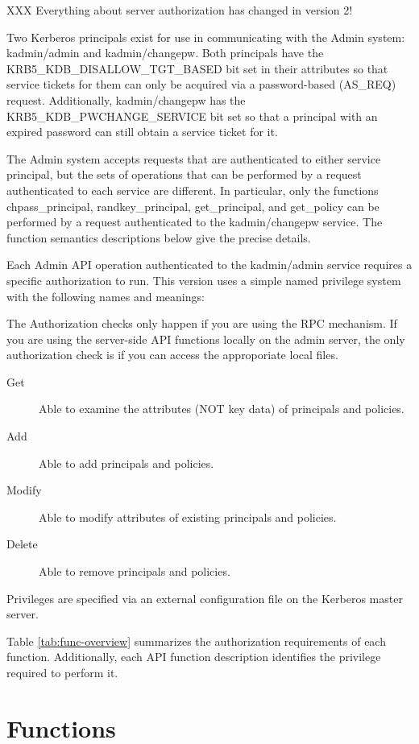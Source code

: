 XXX Everything about server authorization has changed in version 2!

Two Kerberos principals exist for use in communicating with the Admin
system: kadmin/admin and kadmin/changepw.  Both principals
have the KRB5_KDB_DISALLOW_TGT_BASED bit set in their attributes so
that service tickets for them can only be acquired via a
password-based (AS_REQ) request.  Additionally, kadmin/changepw
has the KRB5_KDB_PWCHANGE_SERVICE bit set so that a principal with an
expired password can still obtain a service ticket for it.

The Admin system accepts requests that are authenticated to either
service principal, but the sets of operations that can be performed by
a request authenticated to each service are different.  In particular,
only the functions chpass_principal, randkey_principal, get_principal,
and get_policy can be performed by a request authenticated to the
kadmin/changepw service.  The function semantics descriptions below
give the precise details.

Each Admin API operation authenticated to the kadmin/admin service
requires a specific authorization to run.  This version uses a simple
named privilege system with the following names and meanings:

The Authorization checks only happen if you are using the RPC mechanism.
If you are using the server-side API functions locally on the admin server,
the only authorization check is if you can access the approporiate local
files. 

\begin{description}
\item[Get] Able to examine the attributes (NOT key data) of principals
and policies. 
\item[Add] Able to add principals and policies.
\item[Modify] Able to modify attributes of existing principals and policies.
\item[Delete] Able to remove principals and policies.
\end{description}

Privileges are specified via an external configuration file on the
Kerberos master server.

Table \ref{tab:func-overview} summarizes the authorization
requirements of each function.  Additionally, each API function
description identifies the privilege required to perform it.

\section{Functions}

